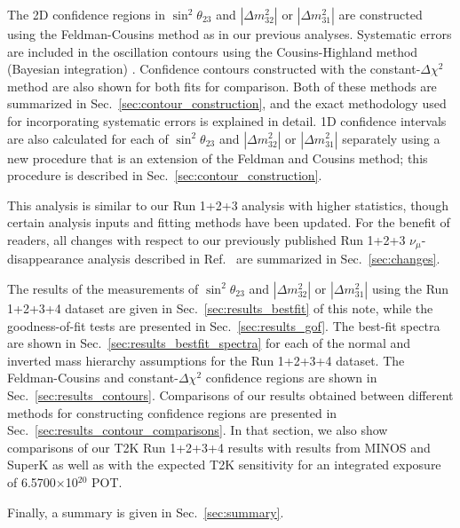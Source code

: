 The 2D confidence regions in $\sin^{2}\theta_{23}$ and $|\Delta m^{2}_{32}|$ or $|\Delta m^{2}_{31}|$ are constructed using 
the Feldman-Cousins method \cite{FeldmanCousins} as in our previous analyses. 
Systematic errors are included in the oscillation contours using the 
Cousins-Highland method (Bayesian integration) \cite{CousinsHighland}.
Confidence contours constructed with the constant-$\Delta\chi^{2}$ method are also shown for both fits for comparison.
Both of these methods are summarized in Sec.\ \ref{sec:contour_construction}, and
the exact methodology used for incorporating systematic errors is explained in detail.
1D confidence intervals are also calculated for each of $\sin^{2}\theta_{23}$ and $|\Delta m^{2}_{32}|$ or $|\Delta m^{2}_{31}|$ separately 
using a new procedure that is an extension of the Feldman and Cousins method; this procedure is described in Sec.\ 
\ref{sec:contour_construction}.

This analysis is similar to our Run 1+2+3 analysis with higher statistics, though certain analysis inputs and fitting methods 
have been updated. For the benefit of readers, all changes with respect to our previously published 
Run 1+2+3 $\nu_{\mu}$-disappearance analysis described in Ref.\ \cite{OurRun123DisappAnalysis3Flavour} 
are summarized in Sec.\ \ref{sec:changes}.

The results of the measurements of $\sin^{2}\theta_{23}$ and $|\Delta m^{2}_{32}|$ or $|\Delta m^{2}_{31}|$ 
using the Run 1+2+3+4 dataset are given in Sec.\ \ref{sec:results_bestfit} of this note, 
while the goodness-of-fit tests are presented in Sec.\ \ref{sec:results_gof}.
The best-fit spectra are shown in Sec.\ \ref{sec:results_bestfit_spectra} for each of the normal and inverted mass hierarchy assumptions for the 
Run 1+2+3+4 dataset.
The Feldman-Cousins and constant-$\Delta\chi^{2}$ confidence regions are shown in Sec.\ \ref{sec:results_contours}. 
Comparisons of our results obtained between different methods for constructing confidence regions are presented in Sec.\ \ref{sec:results_contour_comparisons}.
In that section, we also show comparisons of our T2K Run 1+2+3+4 results with results from MINOS and SuperK
as well as with the expected T2K sensitivity for an integrated exposure of 6.5700$\times$10$^{20}$ POT.

Finally, a summary is given in Sec.\ \ref{sec:summary}.  

\clearpage

